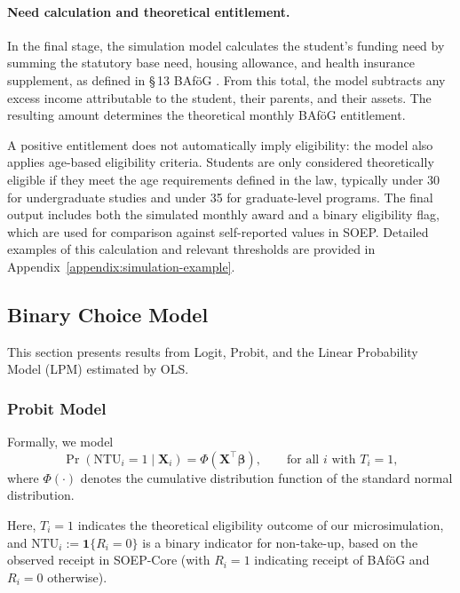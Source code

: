 \paragraph{Need calculation and theoretical entitlement.}
In the final stage, the simulation model calculates the student's funding need by summing the statutory base need, housing allowance, and health insurance supplement, as defined in §\,13 BAföG \citep{bafoeg_law}. 
From this total, the model subtracts any excess income attributable to the student, their parents, and their assets. 
The resulting amount determines the theoretical monthly BAföG entitlement.

A positive entitlement does not automatically imply eligibility: the model also applies age-based eligibility criteria. 
Students are only considered theoretically eligible if they meet the age requirements defined in the law, typically under 30 for undergraduate studies and under 35 for graduate-level programs. 
The final output includes both the simulated monthly award and a binary eligibility flag, which are used for comparison against self-reported values in SOEP. 
Detailed examples of this calculation and relevant thresholds are provided in Appendix~\ref{appendix:simulation-example}.



\subsection{Binary Choice Model}
This section presents results from Logit, Probit, and the Linear Probability Model (LPM) estimated by OLS.

\subsubsection{Probit Model}
Formally, we model
\begin{equation}
  \Pr(\mathrm{NTU}_i = 1 \mid \mathbf{X}_i) = \Phi(\mathbf{X}^\top \boldsymbol{\beta})
  , \qquad \text{for all } i \text{ with } T_i = 1,
\end{equation}
where \( \Phi(\cdot) \) denotes the cumulative distribution function of the standard normal distribution. 

Here, \( T_i = 1 \) indicates the theoretical eligibility outcome of our microsimulation, and \( \mathrm{NTU}_i := \mathbf{1}\{R_i = 0\} \) is a binary indicator for non-take-up, based on the observed receipt in SOEP-Core (with \( R_i = 1 \) indicating receipt of BAföG and \( R_i = 0 \) otherwise).


